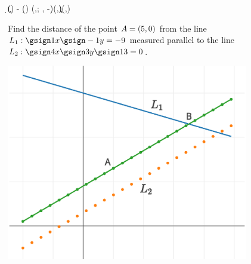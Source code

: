



\FRACTIONSIMPLIFY{-\vf}\vg\n\d
\gcalcexpr[0]\c{(\n * \va) - (\d * \vb)}
\SOLVELINEARSYSTEM(\vc,\vd ; \n, -\d)(\ve,\c)(\p,\q)

\question Find the distance of the point $A = (5, 0)$ from the line 
$L_1: \gsign\vc x \gsign\vd y = \ve$ measured parallel to the line 
$L_2: \gsign\vf x \gsign\vg y \gsign\vh = 0$.

\watchout

\ifprintanswers
  \vspace{0.3cm}
  \includegraphics[width=300pt]{plotly.eps}
\fi 

